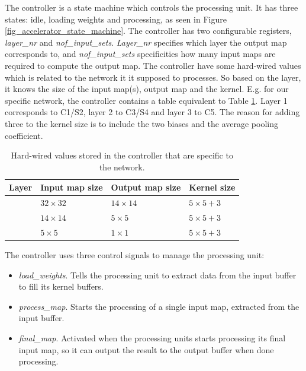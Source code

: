 The controller is a state machine which controls the processing unit. It has three states: idle, loading weights and processing, as seen in Figure \ref{fig_accelerator_state_machine}. The controller has two configurable registers, \textit{layer\_nr} and \textit{nof\_input\_sets}. \textit{Layer\_nr} specifies which layer the output map corresponds to, and \textit{nof\_input\_sets} specificities how many input maps are required to compute the output map. The controller have some hard-wired values which is related to the network it it supposed to processes. So based on the layer, it knows the size of the input map(s), output map and the kernel. E.g. for our specific network, the controller contains a table equivalent to Table \ref{table_controller}. Layer 1 corresponds to C1/S2, layer 2 to C3/S4 and layer 3 to C5. The reason for adding three to the kernel size is to include the two biases and the average pooling coefficient.

\begin{table}
	\centering
    \begin{tabular}{| >{\centering\arraybackslash}m{1.0in} | >{\centering\arraybackslash}m{1.0in} | >{\centering\arraybackslash}m{1.2in} |>{\centering\arraybackslash}m{1.0in} |} 
    \hline
    Layer & Input map size & Output map size & Kernel size \\ \hline
    1 & $ 32 \times 32 $ & $ 14 \times 14 $ & $ 5 \times 5 + 3 $ \\ \hline
    2 & $ 14 \times 14 $ & $ 5\times 5 $ & $ 5 \times 5 + 3$ \\ \hline
    3 & $ 5 \times 5 $ & $ 1 \times 1 $ & $ 5 \times 5 + 3 $ \\ \hline
        \end{tabular}
    \caption[Controller table]{Hard-wired values stored in the controller that are specific to the network.}
   	\label{table_controller}
\end{table}

The controller uses three control signals to manage the processing unit:

\begin{itemize}
\item \textit{load\_weights}. Tells the processing unit to extract data from the input buffer to fill its kernel buffers.
\item \textit{process\_map}.  Starts the processing of a single input map, extracted from the input buffer. 
\item \textit{final\_map}. Activated when the processing units starts processing its final input map, so it can output the result to the output buffer when done processing. 
\end{itemize}


